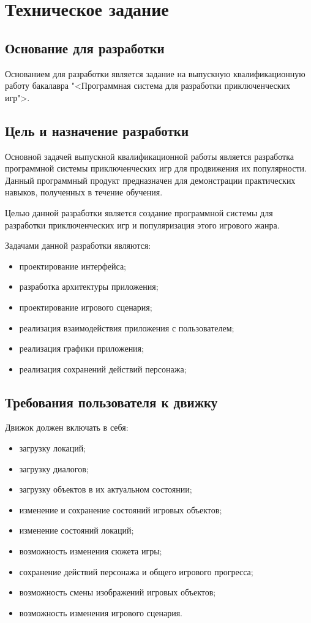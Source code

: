 \section{Техническое задание}
\subsection{Основание для разработки}

Основанием для разработки является задание на выпускную квалификационную работу бакалавра "<Программная система для разработки приключенческих игр">.

\subsection{Цель и назначение разработки}

Основной задачей выпускной квалификационной работы является разработка программной системы приключенческих игр для продвижения их популярности. Данный программный продукт предназначен для демонстрации практических навыков, полученных в течение обучения.

Целью данной разработки является создание программной системы для разработки приключенческих игр и популяризация этого игрового жанра.

Задачами данной разработки являются:
\begin{itemize}
\item проектирование интерфейса;
\item разработка архитектуры приложения;
\item проектирование игрового сценария;
\item реализация взаимодействия приложения с пользователем;
\item реализация графики приложения;
\item реализация сохранений действий персонажа;
\end{itemize}

\subsection{Требования пользователя к движку}

Движок должен включать в себя:
\begin{itemize}
    \item загрузку локаций;
    \item загрузку диалогов;
    \item загрузку объектов в их актуальном состоянии;
    \item изменение и сохранение состояний игровых объектов;
    \item изменение состояний локаций;
    \item возможность изменения сюжета игры;
    \item сохранение действий персонажа и общего игрового прогресса;
    \item возможность смены изображений игровых объектов;
    \item возможность изменения игрового сценария.
\end{itemize}

